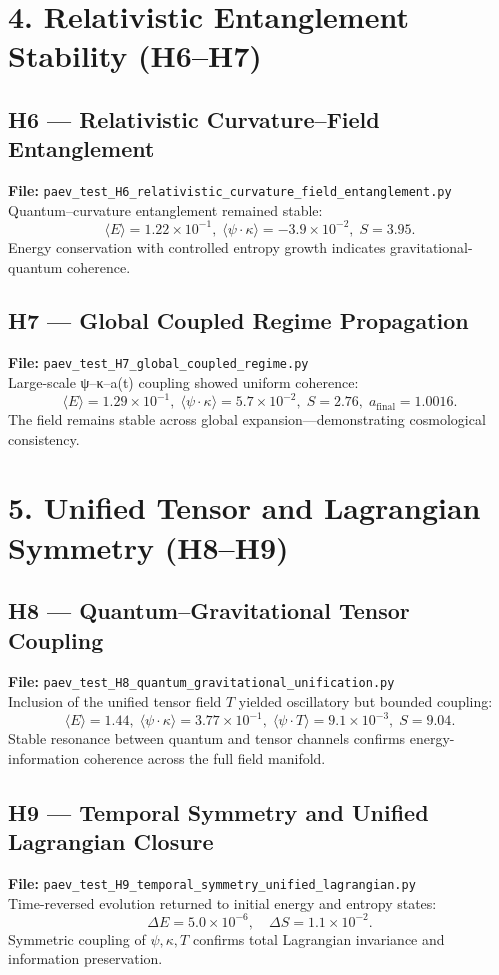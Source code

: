 \documentclass[12pt]{article}
\begin{document}
\section*{4. Relativistic Entanglement Stability (H6–H7)}

\subsection*{H6 — Relativistic Curvature–Field Entanglement}
\textbf{File:} \texttt{paev\_test\_H6\_relativistic\_curvature\_field\_entanglement.py}\\
Quantum–curvature entanglement remained stable:
\[
\langle E\rangle=1.22\times10^{-1},\;
\langle\psi\!\cdot\!\kappa\rangle=-3.9\times10^{-2},\;
S=3.95.
\]
Energy conservation with controlled entropy growth indicates gravitational-quantum coherence.

\subsection*{H7 — Global Coupled Regime Propagation}
\textbf{File:} \texttt{paev\_test\_H7\_global\_coupled\_regime.py}\\
Large-scale ψ–κ–a(t) coupling showed uniform coherence:
\[
\langle E\rangle=1.29\times10^{-1},\;
\langle\psi\!\cdot\!\kappa\rangle=5.7\times10^{-2},\;
S=2.76,\;
a_{\text{final}}=1.0016.
\]
The field remains stable across global expansion—demonstrating cosmological consistency.

\section*{5. Unified Tensor and Lagrangian Symmetry (H8–H9)}

\subsection*{H8 — Quantum–Gravitational Tensor Coupling}
\textbf{File:} \texttt{paev\_test\_H8\_quantum\_gravitational\_unification.py}\\
Inclusion of the unified tensor field \(T\) yielded oscillatory but bounded coupling:
\[
\langle E\rangle=1.44,\;
\langle\psi\!\cdot\!\kappa\rangle=3.77\times10^{-1},\;
\langle\psi\!\cdot\!T\rangle=9.1\times10^{-3},\;
S=9.04.
\]
Stable resonance between quantum and tensor channels confirms energy-information coherence across the full field manifold.

\subsection*{H9 — Temporal Symmetry and Unified Lagrangian Closure}
\textbf{File:} \texttt{paev\_test\_H9\_temporal\_symmetry\_unified\_lagrangian.py}\\
Time-reversed evolution returned to initial energy and entropy states:
\[
\Delta E=5.0\times10^{-6},\quad
\Delta S=1.1\times10^{-2}.
\]
Symmetric coupling of \(\psi,\kappa,T\) confirms total Lagrangian invariance and information preservation.
\end{document}
